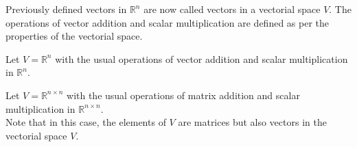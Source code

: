 \begin{definition}[Vector]
    Previously defined vectors in $\mathbb{R}^n$ are now called vectors in a vectorial space $V$. The operations of vector addition and scalar multiplication are defined as per the properties of the vectorial space.
\end{definition}

\begin{eg}
    Let $V = \mathbb{R}^n$ with the usual operations of vector addition and scalar multiplication in $\mathbb{R}^n$. 
\end{eg}

\begin{eg}
    Let $V = \mathbb{R}^{n \times n}$ with the usual operations of matrix addition and scalar multiplication in $\mathbb{R}^{n \times n}$. \\
    Note that in this case, the elements of $V$ are matrices but also vectors in the vectorial space $V$.
\end{eg}

